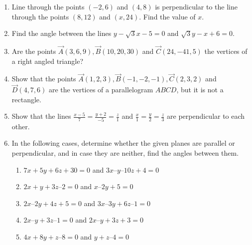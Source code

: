 \begin{enumerate}[label=\thesubsection.\arabic*, ref=\thesubsection.\theenumi]
\label{chapters/11/10/1/6}
\\
\solution

\item Line through the points $(-2,6)$ and $(4,8)$ is perpendicular to the line through the points $(8,12)$ and $(x,24)$. Find the value of $x$.
\item Find the angle between the lines $y-\sqrt 3x-5=0$ and $\sqrt 3y-x+6=0$.
\item Are the points $\vec{A}(3,6,9), \vec{B}(10,20,30)$ and $\vec{C}(24,-41,5)$ the vertices of a right angled triangle?
\item Show that the points $\vec{A}(1,2,3), \vec{B}(-1,-2,-1), \vec{C}(2,3,2)$ and $\vec{D}(4,7,6)$ are the vertices of a parallelogram $ABCD$, but it is not a rectangle.
\item Show that the lines $ \frac{x-5}{7}=\frac{y+2}{-5}=\frac{z}{1}$ and $ \frac{x}{1}=\frac{y}{2}=\frac{z}{3}$ are perpendicular to each other.
\item In the following cases,  determine whether the given planes are parallel or perpendicular,  and in case they are neither,  find the angles between them.
\begin{enumerate}
\item $7x + 5y + 6z + 30 = 0$ and $3x – y – 10z + 4 = 0$
\item $2x + y + 3z – 2 = 0$ and $x – 2y + 5 = 0$
\item $2x – 2y + 4z + 5 = 0$ and $3x – 3y + 6z – 1 = 0$
\item $2x – y + 3z – 1 = 0$ and $2x – y + 3z + 3 = 0$
\item $4x + 8y + z – 8 = 0$ and $y + z – 4 = 0$
\end{enumerate}
    \solution
		
\end{enumerate}
